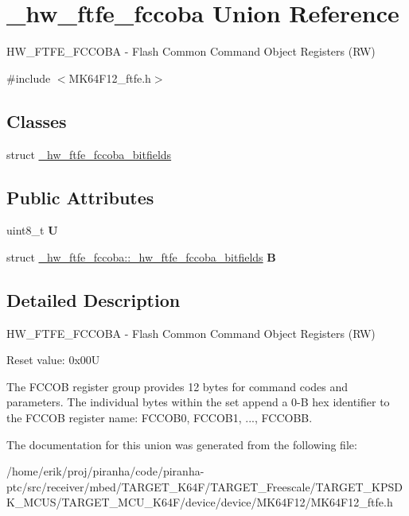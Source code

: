 \hypertarget{union__hw__ftfe__fccoba}{}\section{\+\_\+hw\+\_\+ftfe\+\_\+fccoba Union Reference}
\label{union__hw__ftfe__fccoba}


H\+W\+\_\+\+F\+T\+F\+E\+\_\+\+F\+C\+C\+O\+BA -\/ Flash Common Command Object Registers (RW)  




{\ttfamily \#include $<$M\+K64\+F12\+\_\+ftfe.\+h$>$}

\subsection*{Classes}
\begin{DoxyCompactItemize}
\item 
struct \hyperlink{struct__hw__ftfe__fccoba_1_1__hw__ftfe__fccoba__bitfields}{\+\_\+hw\+\_\+ftfe\+\_\+fccoba\+\_\+bitfields}
\end{DoxyCompactItemize}
\subsection*{Public Attributes}
\begin{DoxyCompactItemize}
\item 
uint8\+\_\+t {\bfseries U}\hypertarget{union__hw__ftfe__fccoba_a15a69059c140a71ae0d0d7107cfd374a}{}\label{union__hw__ftfe__fccoba_a15a69059c140a71ae0d0d7107cfd374a}

\item 
struct \hyperlink{struct__hw__ftfe__fccoba_1_1__hw__ftfe__fccoba__bitfields}{\+\_\+hw\+\_\+ftfe\+\_\+fccoba\+::\+\_\+hw\+\_\+ftfe\+\_\+fccoba\+\_\+bitfields} {\bfseries B}\hypertarget{union__hw__ftfe__fccoba_aaeb8d03d2f30299796c59e38880b6d11}{}\label{union__hw__ftfe__fccoba_aaeb8d03d2f30299796c59e38880b6d11}

\end{DoxyCompactItemize}


\subsection{Detailed Description}
H\+W\+\_\+\+F\+T\+F\+E\+\_\+\+F\+C\+C\+O\+BA -\/ Flash Common Command Object Registers (RW) 

Reset value\+: 0x00U

The F\+C\+C\+OB register group provides 12 bytes for command codes and parameters. The individual bytes within the set append a 0-\/B hex identifier to the F\+C\+C\+OB register name\+: F\+C\+C\+O\+B0, F\+C\+C\+O\+B1, ..., F\+C\+C\+O\+BB. 

The documentation for this union was generated from the following file\+:\begin{DoxyCompactItemize}
\item 
/home/erik/proj/piranha/code/piranha-\/ptc/src/receiver/mbed/\+T\+A\+R\+G\+E\+T\+\_\+\+K64\+F/\+T\+A\+R\+G\+E\+T\+\_\+\+Freescale/\+T\+A\+R\+G\+E\+T\+\_\+\+K\+P\+S\+D\+K\+\_\+\+M\+C\+U\+S/\+T\+A\+R\+G\+E\+T\+\_\+\+M\+C\+U\+\_\+\+K64\+F/device/device/\+M\+K64\+F12/M\+K64\+F12\+\_\+ftfe.\+h\end{DoxyCompactItemize}

